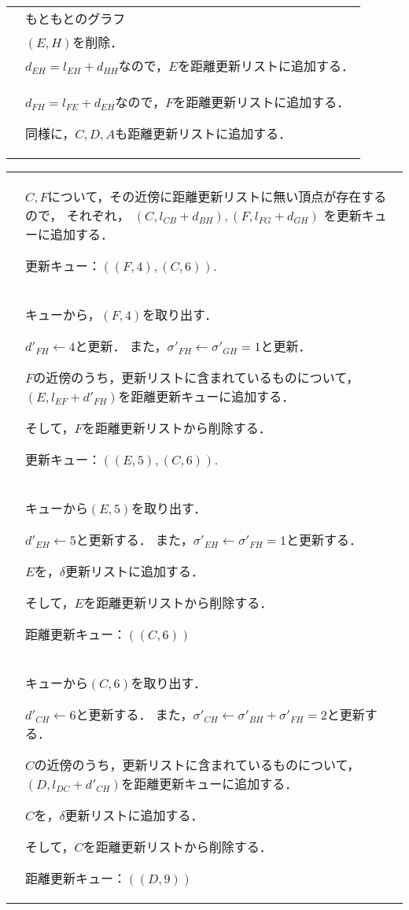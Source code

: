 \begin{tabular}{cp{8cm}}
  \raisebox{-.8\totalheight}{\fbox{
    \def\svgwidth{.35\linewidth}
    
  }}
  &
  もともとのグラフ
  \\
  \raisebox{-.8\totalheight}{\fbox{
    \def\svgwidth{.35\linewidth}
    
  }}
  &
  $(E,H)$を削除．
  \\
  \raisebox{-.8\totalheight}{\fbox{
    \def\svgwidth{.35\linewidth}
    
  }}
  &
  $d_{EH}=l_{EH}+d_{HH}$なので，$E$を距離更新リストに追加する．
  \\
  \raisebox{-.8\totalheight}{\fbox{
    \def\svgwidth{.35\linewidth}
    
  }}
  &
  $d_{FH}=l_{FE}+d_{EH}$なので，$F$を距離更新リストに追加する．

  同様に，$C,D,A$も距離更新リストに追加する．
\end{tabular}
\newpage
\begin{tabular}{cp{8cm}}
  \\
  \raisebox{-.8\totalheight}{\fbox{
    \def\svgwidth{.35\linewidth}
    
  }}
  &
  $C,F$について，その近傍に距離更新リストに無い頂点が存在するので，
  それぞれ，
  $(C,l_{CB}+d_{BH}),(F,l_{FG}+d_{GH})$
  を更新キューに追加する．

  更新キュー：$((F,4),(C,6))$.
  \\
  \raisebox{-.8\totalheight}{\fbox{
    \def\svgwidth{.35\linewidth}
    
  }}
  &
  キューから，$(F,4)$を取り出す．

  $d'_{FH}\gets 4$と更新．
  また，$\sigma'_{FH}\gets\sigma'_{GH}=1$と更新．

  $F$の近傍のうち，更新リストに含まれているものについて，
  $(E,l_{EF}+d'_{FH})$を距離更新キューに追加する．

  そして，$F$を距離更新リストから削除する．

  更新キュー：$((E,5),(C,6))$.
  \\
  \raisebox{-.8\totalheight}{\fbox{
    \def\svgwidth{.35\linewidth}
    
  }}
  &
  キューから$(E,5)$を取り出す．

  $d'_{EH}\gets 5$と更新する．
  また，$\sigma'_{EH}\gets\sigma'_{FH}=1$と更新する．

  $E$を，$\delta$更新リストに追加する．

  そして，$E$を距離更新リストから削除する．

  距離更新キュー：$((C,6))$
  \\
  \raisebox{-.8\totalheight}{\fbox{
    \def\svgwidth{.35\linewidth}
    
  }}
  &
  キューから$(C,6)$を取り出す．

  $d'_{CH}\gets 6$と更新する．
  また，$\sigma'_{CH}\gets\sigma'_{BH}+\sigma'_{FH}=2$と更新する．

  $C$の近傍のうち，更新リストに含まれているものについて，
  $(D,l_{DC}+d'_{CH})$を距離更新キューに追加する．

  $C$を，$\delta$更新リストに追加する．

  そして，$C$を距離更新リストから削除する．

  距離更新キュー：$((D,9))$
\end{tabular}
